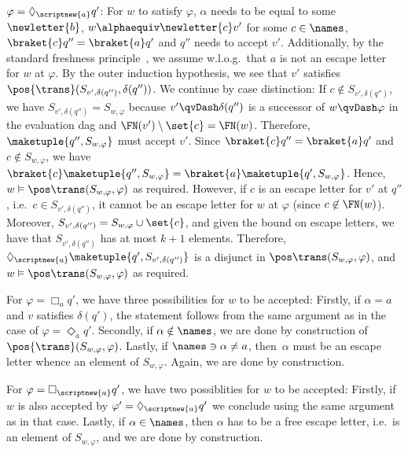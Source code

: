 \documentclass[10pt, final, conference, a4paper, twocolumn]{IEEEtran}
\begin{document}
\begin{IEEEproof}
  $\varphi = \Diamond_{\scriptnew{a}} q'$: For $w$ to satisfy
  $\varphi$, $\alpha$ needs to be equal to some $\newletter{b}$,
  $w \alphaequiv \newletter{c}v'$ for some $c \in \names$,
  $\braket{c}q'' = \braket{a}q'$ and $q''$ needs to accept
  $v'$. Additionally, by the standard freshness principle~\cite{Pitts2013},
  we assume w.l.o.g.~that $a$ is not an escape letter for $w$ at
  $\varphi$. By the outer induction hypothesis, we see that $v'$
  satisfies $\pos{\trans}({S_{v',\delta(q'')}}, \delta(q''))$.
  We continue by case distinction: If $c \notin S_{v',\delta(q'')}$,
  we have $S_{v',\delta(q'')} = S_{w,\varphi}$ because $v' \qvDash \delta(q'')$
  is a successor of $w \qvDash \varphi$ in the evaluation dag and
  $\FN(v') \setminus \set{c} = \FN(w)$. Therefore, $\maketuple{q'',S_{w,\varphi}}$ must accept $v'$.
  Since $\braket{c}q'' = \braket{a}q'$ and $c \notin S_{w,\varphi}$,
  we have $\braket{c}\maketuple{q'',S_{w,\varphi}} = \braket{a}\maketuple{q',S_{w,\varphi}}$.
  Hence, $w \vDash \pos\trans({S_{w,\varphi}}, \varphi)$ as required.
  However, if $c$ is an escape letter for $v'$ at $q''$,
  i.e.~$c \in S_{v',\delta(q'')}$, it cannot be an escape letter for $w$
  at $\varphi$ (since $c\not\in\FN(w)$). Moreover, $S_{v',\delta(q'')} = S_{w,\varphi} \cup \set{c}$,
  and given the bound on escape letters, we have that $S_{v',\delta(q'')}$
  has at most $k + 1$ elements. Therefore, $\Diamond_{\scriptnew{a}} \maketuple{q',S_{v',\delta(q'')}}$
  is a disjunct in $\pos\trans({S_{w,\varphi}}, \varphi)$, and
  $w \vDash \pos\trans({S_{w,\varphi}}, \varphi)$ as required.

  For $\varphi = \Box_a q'$, we have three possibilities for $w$ to be
  accepted: Firstly, if $\alpha = a$ and $v$ satisfies $\delta(q')$, the
  statement follows from the same argument as in the case of $\varphi = \Diamond_a q'$.
  Secondly, if $\alpha \notin \names$, we are done by construction of $\pos{\trans}({S_{w,\varphi}}, \varphi)$.
  Lastly, if $\names \ni \alpha \neq a$, then~$\alpha$ must be an escape letter
  whence an element of $S_{w,\varphi}$. Again, we are done by construction.

  For $\varphi = \Box_{\scriptnew{a}} q'$, we have two possiblities for
  $w$ to be accepted: Firstly, if $w$ is also accepted by $\varphi' =
  \Diamond_{\scriptnew{a}} q'$ we conclude using the same
  argument as in that case.
  Lastly, if $\alpha \in \names$, then $\alpha$ has to be a free
  escape letter, i.e.~is an element of $S_{w,\varphi}$, and we are done
  by construction.
\end{IEEEproof}
\end{document}
